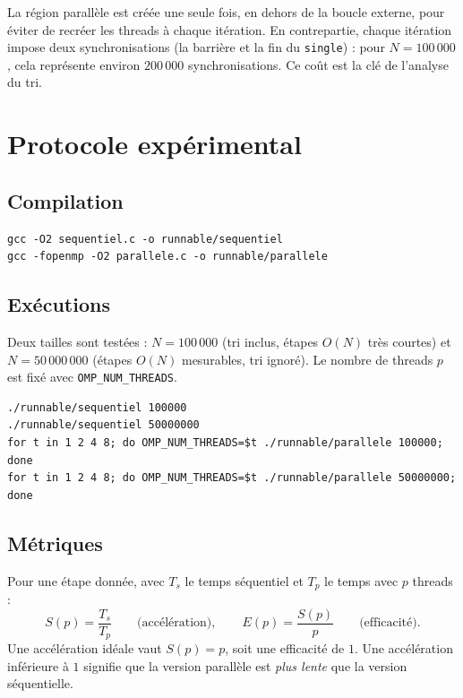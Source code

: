 \documentclass[11pt,a4paper]{article}
\begin{document}
La région parallèle est créée une seule fois, en dehors de la boucle externe, pour éviter de recréer les threads à chaque itération. En contrepartie, chaque itération impose deux synchronisations (la barrière et la fin du \texttt{single}) : pour $N = 100\,000$, cela représente environ $200\,000$ synchronisations. Ce coût est la clé de l'analyse du tri.

\section{Protocole expérimental}

\subsection{Compilation}

\begin{verbatim}
gcc -O2 sequentiel.c -o runnable/sequentiel
gcc -fopenmp -O2 parallele.c -o runnable/parallele
\end{verbatim}

\subsection{Exécutions}

Deux tailles sont testées : $N = 100\,000$ (tri inclus, étapes $O(N)$ très courtes) et $N = 50\,000\,000$ (étapes $O(N)$ mesurables, tri ignoré). Le nombre de threads $p$ est fixé avec \texttt{OMP\_NUM\_THREADS}.

\begin{verbatim}
./runnable/sequentiel 100000
./runnable/sequentiel 50000000
for t in 1 2 4 8; do OMP_NUM_THREADS=$t ./runnable/parallele 100000; done
for t in 1 2 4 8; do OMP_NUM_THREADS=$t ./runnable/parallele 50000000; done
\end{verbatim}

\subsection{Métriques}

Pour une étape donnée, avec $T_s$ le temps séquentiel et $T_p$ le temps avec $p$ threads :
\[
S(p) = \frac{T_s}{T_p} \qquad\text{(accélération)}, \qquad
E(p) = \frac{S(p)}{p} \qquad\text{(efficacité)}.
\]
Une accélération idéale vaut $S(p) = p$, soit une efficacité de $1$. Une accélération inférieure à $1$ signifie que la version parallèle est \emph{plus lente} que la version séquentielle.
\end{document}
